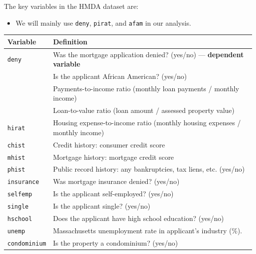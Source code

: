 \documentclass[
  12pt,
  a4paper,
]{scrbook}
\newcounter{none} %
\providecommand{\tightlist}{%
  \setlength{\itemsep}{0pt}\setlength{\parskip}{0pt}}
\renewcommand{\tightlist}{\setlength{\itemsep}{0.5\baselineskip}\setlength{\parskip}{0.2\baselineskip}}
\theoremstyle{plain}
\theoremstyle{definition}
\theoremstyle{remark}
\begin{document}
The key variables in the HMDA dataset are:

\begin{itemize}
\tightlist
\item
  We will mainly use \texttt{deny}, \texttt{pirat}, and \texttt{afam} in
  our analysis.
\end{itemize}


{\def\LTcaptype{none} %
\begin{longtable}[]{@{}
  >{\raggedright\arraybackslash}p{}
  >{\raggedright\arraybackslash}p{}@{}}
\toprule\noalign{}
\begin{minipage}[b]{\linewidth}\raggedright
Variable
\end{minipage} & \begin{minipage}[b]{\linewidth}\raggedright
Definition
\end{minipage} \\
\midrule\noalign{}
\endhead
\bottomrule\noalign{}
\endlastfoot
{\texttt{deny}} & Was the mortgage application denied? (yes/no) ---
\textbf{dependent variable} \\
{\texttt{afam}} & Is the applicant African American? (yes/no) \\
{\texttt{pirat}} & Payments-to-income ratio (monthly loan payments /
monthly income) \\
{\texttt{lvrat}} & Loan-to-value ratio (loan amount / assessed property
value) \\
\texttt{hirat} & Housing expense-to-income ratio (monthly housing
expenses / monthly income) \\
\texttt{chist} & Credit history: consumer credit score \\
\texttt{mhist} & Mortgage history: mortgage credit score \\
\texttt{phist} & Public record history: any bankruptcies, tax liens,
etc. (yes/no) \\
\texttt{insurance} & Was mortgage insurance denied? (yes/no) \\
\texttt{selfemp} & Is the applicant self-employed? (yes/no) \\
\texttt{single} & Is the applicant single? (yes/no) \\
\texttt{hschool} & Does the applicant have high school education?
(yes/no) \\
\texttt{unemp} & 1989 Massachusetts unemployment rate in applicant's
industry (\%). \\
\texttt{condominium} & Is the property a condominium? (yes/no) \\
\end{longtable}
}
\end{document}
